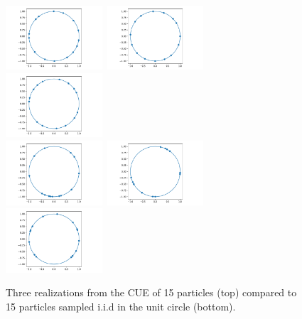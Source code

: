 \documentclass[twoside,11pt]{book}
\begin{document}



\begin{figure}
\centering
\includegraphics[width= 0.32\textwidth]{img/circle/CUE_design_N_15_fig_1.pdf}~\includegraphics[width= 0.32\textwidth]{img/circle/CUE_design_N_15_fig_2.pdf}
~\includegraphics[width= 0.32\textwidth]{img/circle/CUE_design_N_15_fig_3.pdf}\\
\includegraphics[width= 0.32\textwidth]{img/circle/iid_design_N_15_fig_1.pdf}~\includegraphics[width= 0.32\textwidth]{img/circle/iid_design_N_15_fig_2.pdf}
~\includegraphics[width= 0.32\textwidth]{img/circle/iid_design_N_15_fig_3.pdf}\\
\caption{Three realizations from the CUE of 15 particles (top) compared to 15 particles sampled i.i.d in the unit circle (bottom). \label{fig:cue_vs_iid_particles}}
\end{figure}
\end{document}
